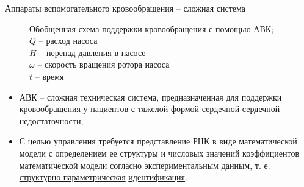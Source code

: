 \documentclass[a4paper, 9pt]{beamer}
\newcommand{\myrec}[1]{\tikz{\path[draw=black,fill=#1,line width=0.25] (0,0) rectangle (0.12,0.20);}} %
\begin{document}
\begin{frame}{Аппараты вспомогательного кровообращения -- сложная система}
\begin{minipage}[ht]{0.48\textwidth}
\begin{figure}
\caption{\scriptsize Обобщенная схема поддержки кровообращения с помощью АВК; \\ $Q$ -- расход насоса \\$H$ -- перепад давления в насосе \\$\omega$ -- скорость вращения ротора насоса \\$t$ -- время}
\end{figure}
\end{minipage}

\footnotesize
\begin{itemize}
 \item АВК -- сложная техническая система, предназначенная для поддержки кровообращения у пациентов с тяжелой формой сердечной сердечной недостаточности,
 \item С целью управления требуется представление РНК в виде математической модели с определением ее структуры и числовых значений коэффициентов математической модели согласно экспериментальным данным, т. е. \underline{структурно-параметрическая} \underline{идентификация}.
\end{itemize}

\end{frame}

% 
% 
% 
\end{document}
